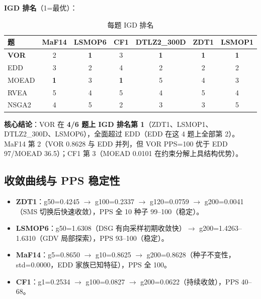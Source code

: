 \documentclass[a4paper,11pt]{article}
\begin{document}
\textbf{IGD 排名}（1=最优）：
\begin{table}[h]
\centering
\caption{每题 IGD 排名}
\label{tab:ranks}
\begin{tabular}{lcccccc}
\toprule
\textbf{题} & \textbf{MaF14} & \textbf{LSMOP6} & \textbf{CF1} & \textbf{DTLZ2\_300D} & \textbf{ZDT1} & \textbf{LSMOP1}\\
\midrule
\textbf{VOR} & 2 & \textbf{1} & 3 & \textbf{1} & \textbf{1} & \textbf{1}\\
EDD & 3 & 2 & 4 & 2 & 2 & 2\\
MOEAD & \textbf{1} & 3 & \textbf{1} & 5 & 4 & 3\\
RVEA & 5 & 4 & 5 & 4 & 5 & 4\\
NSGA2 & 4 & 5 & 2 & 3 & 3 & 5\\
\bottomrule
\end{tabular}
\end{table}

\textbf{核心结论}：VOR 在 \textbf{4/6 题上 IGD 排名第 1}（ZDT1、LSMOP1、DTLZ2\_300D、LSMOP6），全面超过 EDD（EDD 在这 4 题上全部第 2）。MaF14 第 2（VOR 0.8628 与 EDD 并列，但 VOR PPS=100 优于 EDD 97/MOEAD 36.5）；CF1 第 3（MOEAD 0.0101 在约束分解上具结构优势）。

\subsection{收敛曲线与 PPS 稳定性}
\label{sec:conv}
\begin{itemize}
\item \textbf{ZDT1}：g50=0.4245 $\to$ g100=0.2337 $\to$ g120=0.0759 $\to$ g200=0.0041（SMS 切换后快速收敛），PPS 全 10 种子 99--100（稳定）。
\item \textbf{LSMOP6}：g50=1.6308（DSG 有向采样初期收敛快）$\to$ g200=1.4263--1.6310（GDV 局部探索），PPS 93--100（稳定）。
\item \textbf{MaF14}：g5=0.8650 $\to$ g10=0.8625 $\to$ g200=0.8628（种子不变性，std=0.0000，EDD 家族已知特征），PPS 全 100。
\item \textbf{CF1}：g1=0.2534 $\to$ g100=0.0827 $\to$ g200=0.0622（持续收敛），PPS 40--68。
\end{itemize}
\end{document}
